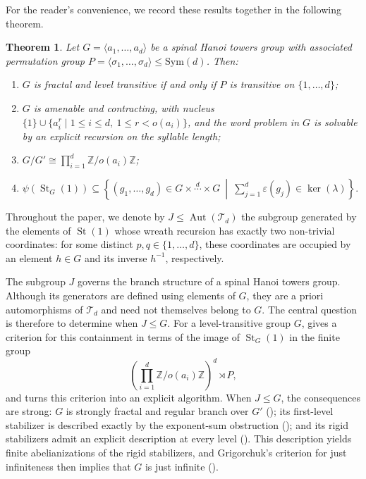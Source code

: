 \documentclass[11pt,leqno]{amsart}
\theoremstyle{plain}
\newtheorem{thmx}{Theorem}
\newcommand\T{{\mathcal{T}}}
\DeclareMathOperator{\Aut}{Aut}
\DeclareMathOperator{\St}{St}
\newcommand{\Sym}{\mathrm{Sym}}
\numberwithin{equation}{section}
\begin{document}
For the reader’s convenience, we record these results together in the following theorem.
\begin{thmx}\label{thmA}
Let $G=\langle a_1,\dots,a_d\rangle$ be a spinal Hanoi towers group with associated permutation group $P=\langle\sigma_1,\dots,\sigma_d\rangle\leq\Sym(d)$. Then:
\begin{enumerate}
\item $G$ is fractal and level transitive if and only if $P$ is transitive on $\{1,\dots,d\}$;
\item $G$ is amenable and contracting, with nucleus $\{1\}\cup\{a_i^r\mid 1\leq i\leq d,\ 1\leq r<o(a_i)\}$, and the word problem in $G$ is solvable by an explicit recursion on the syllable length;
\item $G/G'\cong\prod_{i=1}^d\mathbb{Z}/o(a_i)\mathbb{Z}$;
\item $\psi(\St_G(1))
\subseteq
\left\{
(g_1,\ldots,g_d)\in G\times \stackrel{d}{\cdots}\times G
\ \middle|\
\sum_{j=1}^d \varepsilon(g_j)\in \ker(\lambda)
\right\}.$
\end{enumerate}
\end{thmx}


\medskip
Throughout the paper, we denote by $J\leq \Aut(\T_d)$ the subgroup
generated by the elements of $\St(1)$ whose wreath recursion has exactly two
non-trivial coordinates: for some distinct $p,q\in\{1,\ldots,d\}$, these
coordinates are occupied by an element $h\in G$ and its inverse $h^{-1}$,
respectively.

The subgroup $J$ governs the branch structure of a spinal Hanoi towers
group. Although its generators are defined using elements of $G$, they are
a priori automorphisms of $\T_d$ and need not themselves belong to $G$.
The central question is therefore to determine when $J\leq G$. For a
level-transitive group $G$, \Cref{Transfer} gives a criterion for this
containment in terms of the image of $\St_G(1)$ in the finite group
\[
\left(\prod_{i=1}^d \mathbb{Z}/o(a_i)\mathbb{Z}\right)^d\rtimes P,
\]
and  turns this criterion into an explicit algorithm.
When $J\leq G$, the consequences are strong: $G$ is strongly fractal and
regular branch over $G'$
(); its first-level stabilizer is
described exactly by the exponent-sum obstruction
(); and its rigid
stabilizers admit an explicit description at every level
(). This description yields finite abelianizations
of the rigid stabilizers, and Grigorchuk's criterion for just infiniteness
then implies that $G$ is just infinite
\cite{JI grigorchuk} ().
\end{document}
